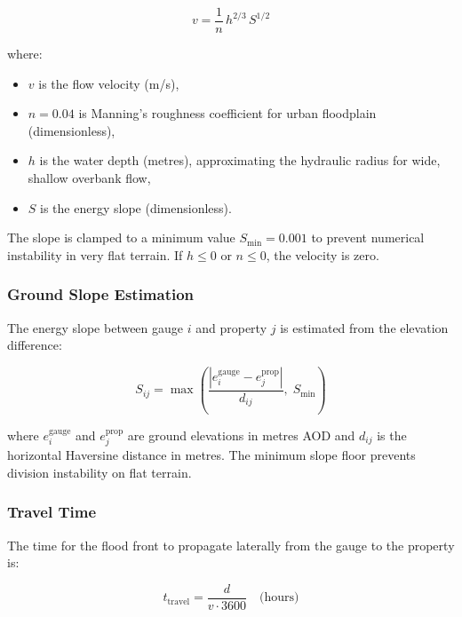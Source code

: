 \documentclass[11pt,a4paper]{article}
\begin{document}
\begin{equation}
    v = \frac{1}{n} \, h^{2/3} \, S^{1/2}
    \label{eq:manning}
\end{equation}

\noindent where:
\begin{itemize}[nosep]
    \item $v$ is the flow velocity (m/s),
    \item $n = 0.04$ is Manning's roughness coefficient for urban floodplain
          (dimensionless),
    \item $h$ is the water depth (metres), approximating the hydraulic radius for
          wide, shallow overbank flow,
    \item $S$ is the energy slope (dimensionless).
\end{itemize}

\noindent The slope is clamped to a minimum value $S_{\min} = 0.001$ to prevent
numerical instability in very flat terrain. If $h \leq 0$ or $n \leq 0$, the
velocity is zero.

\subsubsection{Ground Slope Estimation}

The energy slope between gauge $i$ and property $j$ is estimated from the elevation
difference:

\begin{equation}
    S_{ij} = \max\!\left(\frac{|e_i^{\text{gauge}} - e_j^{\text{prop}}|}{d_{ij}},
    \; S_{\min}\right)
    \label{eq:slope}
\end{equation}

\noindent where $e_i^{\text{gauge}}$ and $e_j^{\text{prop}}$ are ground elevations
in metres AOD and $d_{ij}$ is the horizontal Haversine distance in metres. The
minimum slope floor prevents division instability on flat terrain.

\subsubsection{Travel Time}

The time for the flood front to propagate laterally from the gauge to the property
is:

\begin{equation}
    t_{\text{travel}} = \frac{d}{v \cdot 3600} \quad \text{(hours)}
    \label{eq:travel_time}
\end{equation}
\end{document}
